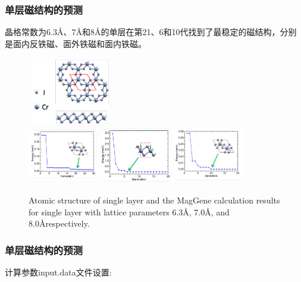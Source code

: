 \documentclass[cjk,slidestop,compress,mathserif,blue]{beamer}
\begin{document}
\frame
{
	\frametitle{单层磁结构的预测}
	晶格常数为6.3\textrm{\AA}、7\textrm{\AA}和8\textrm{\AA}的单层\textrm{}在第21、6和10代找到了最稳定的磁结构，分别是面内反铁磁、面外铁磁和面内铁磁。
\begin{figure}[h!]
\vspace*{-0.08in}
\centering
\includegraphics[height=1.15in,width=1.45in]{Figures/CrI3-struct.png}\\
\includegraphics[height=1.00in,width=1.22in]{Figures/CrI3-Generation-6.png}
\hskip 0.5pt
\includegraphics[height=1.00in,width=1.22in]{Figures/CrI3-Generation-7.png}
\hskip 0.5pt
\includegraphics[height=1.00in,width=1.22in]{Figures/CrI3-Generation-8.png}
\caption{\tiny \textrm{Atomic structure of  single layer and the MagGene calculation results for single layer with lattice parameters 6.3\AA, 7.0\AA, and 8.0\AA respectively.}}%
\label{Fig:FeSe-Generation}
\end{figure}
}

\frame
{
	\frametitle{单层\textrm{}磁结构的预测}
\centering
计算参数\textrm{input.data}文件设置:\\
\vskip 0.3in
}
\end{document}
